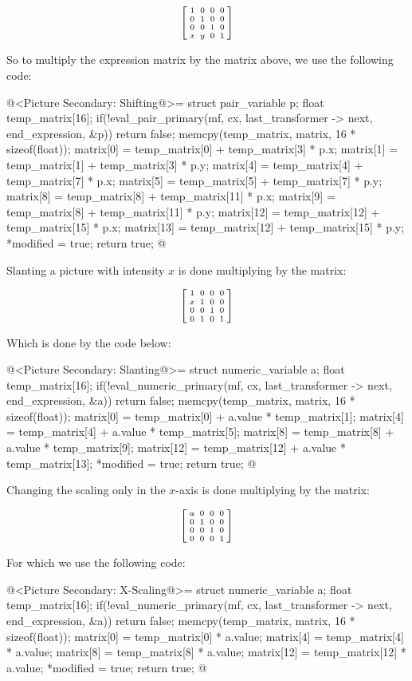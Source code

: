 $$\left[{{1 \atop 0}\atop {0\atop
   x}}{{0 \atop 1}\atop {0 \atop y}}{{0\atop 0}\atop{1 \atop
      0}}{{0 \atop 0}\atop{0\atop 1}}\right]
$$

So to multiply the expression matrix by the matrix above, we use the
following code:

\iniciocodigo
@<Picture Secondary: Shifting@>=
struct pair_variable p;
float temp_matrix[16];
if(!eval_pair_primary(mf, cx, last_transformer -> next, end_expression, &p))
  return false;
memcpy(temp_matrix, matrix, 16 * sizeof(float));
matrix[0] = temp_matrix[0] + temp_matrix[3] * p.x;
matrix[1] = temp_matrix[1] + temp_matrix[3] * p.y;
matrix[4] = temp_matrix[4] + temp_matrix[7] * p.x;
matrix[5] = temp_matrix[5] + temp_matrix[7] * p.y;
matrix[8] = temp_matrix[8] + temp_matrix[11] * p.x;
matrix[9] = temp_matrix[8] + temp_matrix[11] * p.y;
matrix[12] = temp_matrix[12] + temp_matrix[15] * p.x;
matrix[13] = temp_matrix[12] + temp_matrix[15] * p.y;
*modified = true;
return true;
@
\fimcodigo

Slanting a picture with intensity $x$ is done multiplying by the
matrix:

$$\left[{{1 \atop x}\atop {0\atop
      0}}{{0 \atop 1}\atop {0 \atop 1}}{{0\atop 0}\atop{1 \atop
      0}}{{0 \atop 0}\atop{0\atop 1}}\right]
$$


Which is done by the code below:

\iniciocodigo
@<Picture Secondary: Slanting@>=
struct numeric_variable a;
float temp_matrix[16];
if(!eval_numeric_primary(mf, cx, last_transformer -> next, end_expression, &a))
  return false;
memcpy(temp_matrix, matrix, 16 * sizeof(float));
matrix[0] = temp_matrix[0] + a.value * temp_matrix[1];
matrix[4] = temp_matrix[4] + a.value * temp_matrix[5];
matrix[8] = temp_matrix[8] + a.value * temp_matrix[9];
matrix[12] = temp_matrix[12] + a.value  * temp_matrix[13];
*modified = true;
return true;
@
\fimcodigo

Changing the scaling only in the $x$-axis is done multiplying by the matrix:

$$\left[{{a \atop 0}\atop {0\atop
      0}}{{0 \atop 1}\atop {0 \atop 0}}{{0\atop 0}\atop{1 \atop
      0}}{{0 \atop 0}\atop{0\atop 1}}\right]
$$

For which we use the following code:

\iniciocodigo
@<Picture Secondary: X-Scaling@>=
struct numeric_variable a;
float temp_matrix[16];
if(!eval_numeric_primary(mf, cx, last_transformer -> next, end_expression, &a))
  return false;
memcpy(temp_matrix, matrix, 16 * sizeof(float));
matrix[0] = temp_matrix[0] * a.value;
matrix[4] = temp_matrix[4] * a.value;
matrix[8] = temp_matrix[8] * a.value;
matrix[12] = temp_matrix[12] * a.value;
*modified = true;
return true;
@
\fimcodigo

